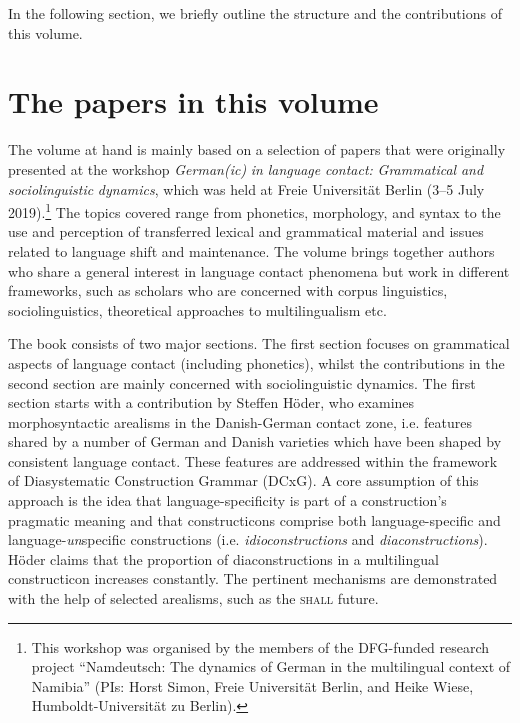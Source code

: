 \documentclass[output=paper]{langsci/langscibook}
\begin{document}
In the following section, we briefly outline the structure and the contributions of this volume. 

\section{The papers in this volume} %
\label{sec:zimmer:2}

The volume at hand is mainly based on a selection of papers that were originally presented at the workshop \textit{German(ic)} \textit{in} \textit{language} \textit{contact:} \textit{Grammatical} \textit{and} \textit{sociolinguistic} \textit{dynamics}, which was held at Freie Universität Berlin (3–5 July 2019).\footnote{This workshop was organised by the members of the DFG-funded research project “Namdeutsch: The dynamics of German in the multilingual context of Namibia” (PIs: Horst Simon, Freie Universität Berlin, and Heike Wiese, Humboldt-Universität zu Berlin).}  The topics covered range from phonetics, morphology, and syntax to the use and perception of transferred lexical and grammatical material and issues related to language shift and maintenance. The volume brings together authors who share a general interest in language contact phenomena but work in different frameworks, such as scholars who are concerned with corpus linguistics, sociolinguistics, theoretical approaches to multilingualism etc. 

The book consists of two major sections. The first section focuses on grammatical aspects of language contact (including phonetics), whilst the contributions in the second section are mainly concerned with sociolinguistic dynamics. The first section starts with a contribution by {Steffen} {Höder,} who examines morphosyntactic arealisms in the Danish-German contact zone, i.e. features shared by a number of German and Danish varieties which have been shaped by consistent language contact. These features are addressed within the framework of Diasystematic Construction Grammar (DCxG). A core assumption of this approach is the idea that language-specificity is part of a construction’s pragmatic meaning and that constructicons comprise both language-specific and language-\textit{un}specific constructions (i.e. \textit{idioconstructions} and \textit{diaconstructions}). Höder claims that the proportion of diaconstructions in a multilingual constructicon increases constantly. The pertinent mechanisms are demonstrated with the help of selected arealisms, such as the \textsc{shall} future. 
\end{document}
